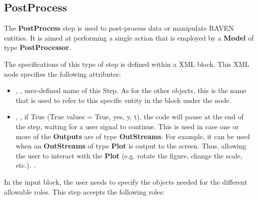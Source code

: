 \subsection{PostProcess}
\label{subsec:stepPostProcess}
The \textbf{PostProcess} step is used to post-process data or manipulate RAVEN
entities.
%
It is aimed at performing a single action that is employed by a
\textbf{Model} of type \textbf{PostProcessor}.
%

The specifications of this type of step is defined within a
 XML block.
%
This XML node specifies the following attributes:
\vspace{-5mm}
\begin{itemize}
\itemsep0em
\item {}, , user-defined name of
  this Step.
  \nb As for the other objects, this is the name that is used to refer to
  this specific entity in the  block under the
   node.
\item {}, , if True
  (True values = True, yes, y, t), the code will pause at the end of
  the step, waiting for a user signal to continue. This is used in case one or
  more of the \textbf{Outputs} are of type \textbf{OutStreams}.
  For example, it can be used when an \textbf{OutStreams} of type
  \textbf{Plot} is output to the screen. Thus, allowing the user to interact
  with the \textbf{Plot} (e.g. rotate the figure, change the scale, etc.).
  .
\end{itemize}
\vspace{-5mm}
In the  input block, the user needs to specify the objects
needed for the different allowable roles.
%
This step accepts the following roles:
